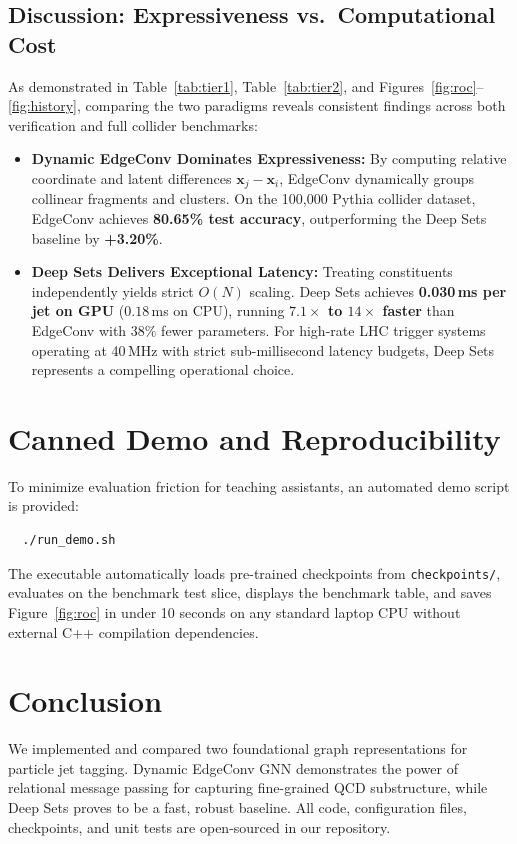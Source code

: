 \documentclass[10pt,twocolumn,letterpaper]{article}
\begin{document}
\subsection{Discussion: Expressiveness vs.\ Computational Cost}
As demonstrated in Table~\ref{tab:tier1}, Table~\ref{tab:tier2}, and Figures~\ref{fig:roc}--\ref{fig:history}, comparing the two paradigms reveals consistent findings across both verification and full collider benchmarks:
\begin{itemize}
    \item \textbf{Dynamic EdgeConv Dominates Expressiveness:} By computing relative coordinate and latent differences $\mathbf{x}_j - \mathbf{x}_i$, EdgeConv dynamically groups collinear fragments and clusters. On the 100,000 Pythia collider dataset, EdgeConv achieves \textbf{80.65\% test accuracy}, outperforming the Deep Sets baseline by \textbf{+3.20\%}.
    \item \textbf{Deep Sets Delivers Exceptional Latency:} Treating constituents independently yields strict $O(N)$ scaling. Deep Sets achieves \textbf{0.030\,ms per jet on GPU} ($0.18$\,ms on CPU), running \textbf{$7.1\times$ to $14\times$ faster} than EdgeConv with $38\%$ fewer parameters. For high-rate LHC trigger systems operating at 40\,MHz with strict sub-millisecond latency budgets, Deep Sets represents a compelling operational choice.
\end{itemize}

\section{Canned Demo and Reproducibility}
To minimize evaluation friction for teaching assistants, an automated demo script is provided:
\begin{verbatim}
  ./run_demo.sh
\end{verbatim}
The executable automatically loads pre-trained checkpoints from \texttt{checkpoints/}, evaluates on the benchmark test slice, displays the benchmark table, and saves Figure~\ref{fig:roc} in under 10 seconds on any standard laptop CPU without external C++ compilation dependencies.

\section{Conclusion}
We implemented and compared two foundational graph representations for particle jet tagging. Dynamic EdgeConv GNN demonstrates the power of relational message passing for capturing fine-grained QCD substructure, while Deep Sets proves to be a fast, robust baseline. All code, configuration files, checkpoints, and unit tests are open-sourced in our repository.
\end{document}
